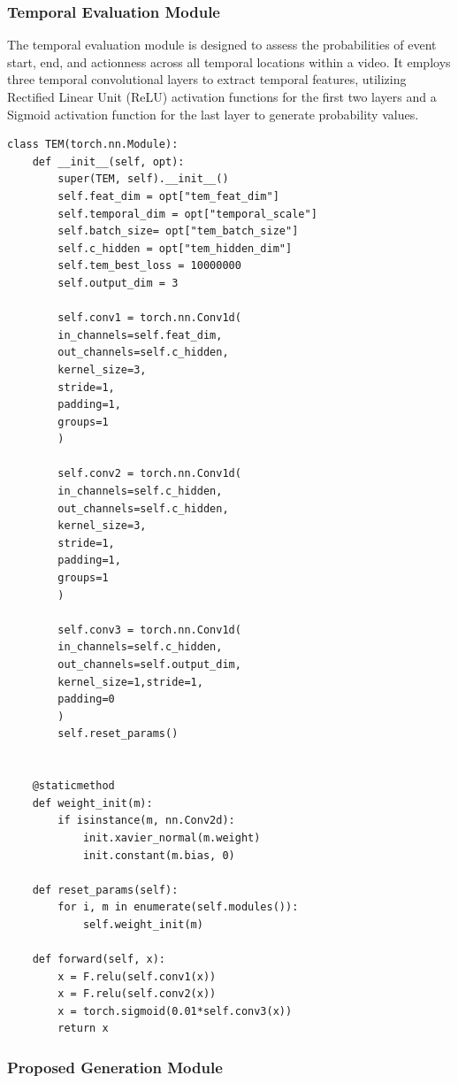 \subsubsection{Temporal Evaluation Module}
The temporal evaluation module is designed to assess the probabilities of event start, end, and actionness across all temporal locations within a video. It employs three temporal convolutional layers to extract temporal features, utilizing Rectified Linear Unit (ReLU) activation functions for the first two layers and a Sigmoid activation function for the last layer to generate probability values.
    \begin{lstlisting}[style=python]
    class TEM(torch.nn.Module):
    def __init__(self, opt):
        super(TEM, self).__init__()
        self.feat_dim = opt["tem_feat_dim"]
        self.temporal_dim = opt["temporal_scale"]
        self.batch_size= opt["tem_batch_size"]
        self.c_hidden = opt["tem_hidden_dim"]
        self.tem_best_loss = 10000000
        self.output_dim = 3  
        
        self.conv1 = torch.nn.Conv1d(
        in_channels=self.feat_dim,
        out_channels=self.c_hidden,
        kernel_size=3,
        stride=1,
        padding=1,
        groups=1
        )
        
        self.conv2 = torch.nn.Conv1d(
        in_channels=self.c_hidden,
        out_channels=self.c_hidden,
        kernel_size=3,
        stride=1,
        padding=1,
        groups=1
        )
    
        self.conv3 = torch.nn.Conv1d(
        in_channels=self.c_hidden,
        out_channels=self.output_dim,
        kernel_size=1,stride=1,
        padding=0
        )
        self.reset_params()
        

    @staticmethod
    def weight_init(m):
        if isinstance(m, nn.Conv2d):
            init.xavier_normal(m.weight)
            init.constant(m.bias, 0)

    def reset_params(self):
        for i, m in enumerate(self.modules()):
            self.weight_init(m)

    def forward(self, x):
        x = F.relu(self.conv1(x))
        x = F.relu(self.conv2(x))
        x = torch.sigmoid(0.01*self.conv3(x))
        return x
    \end{lstlisting}

    \subsubsection{Proposed Generation Module}
    
